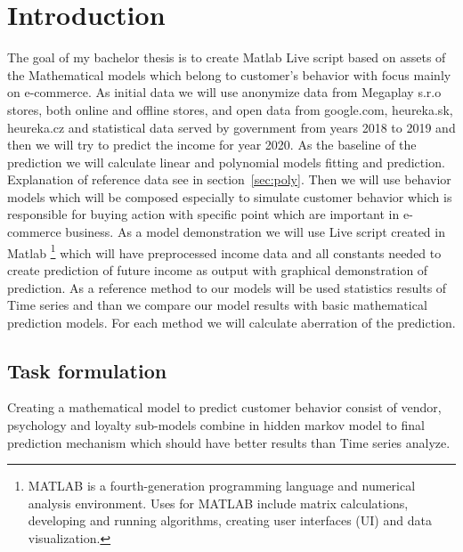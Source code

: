 
{}

\chapter*{Introduction}
The goal of my bachelor thesis is to create  Matlab Live script based on assets of the Mathematical models which belong
to customer’s behavior with focus mainly on e-commerce.
As initial data we will use anonymize data from Megaplay s.r.o stores, both online and offline stores, and open data from google.com,
heureka.sk, heureka.cz and statistical data served by government from years 2018 to 2019 and then we will try to predict the income for year 2020.
As the baseline of the prediction we will calculate linear and polynomial models fitting and prediction.
Explanation of reference data see in section~\ref{sec:poly}.
Then we will use behavior models which will be composed especially to simulate customer behavior which is responsible for
buying action with specific point which are important in e-commerce business.
As a model demonstration we will use  Live script created in Matlab \footnote{MATLAB is a fourth-generation programming
language and numerical analysis environment.
Uses for MATLAB include matrix calculations, developing and running algorithms, creating user interfaces (UI) and data visualization.}
which will have preprocessed income data and all constants needed to create prediction of future income as output with graphical demonstration of prediction.
As a reference method to our models will be used statistics results of Time series and than we compare our model results with
basic mathematical prediction models.
For each method we will calculate aberration of the prediction.

\section*{Task formulation}

Creating a mathematical model to predict customer behavior consist of vendor, psychology and loyalty sub-models combine
in hidden markov model to final prediction mechanism which should have better results than Time series analyze.

